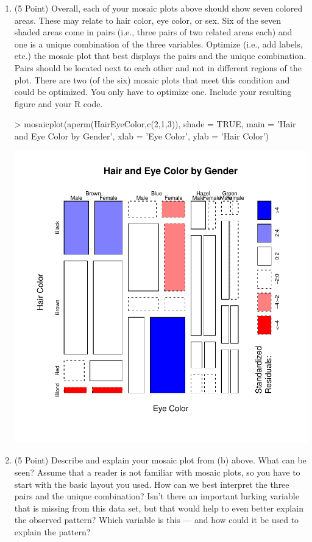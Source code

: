 \documentclass[12pt,letterpaper,final]{article}
\begin{document}
\begin{enumerate}
\begin{enumerate}
\item (5 Point) Overall, each of your mosaic plots above should show seven colored areas.
These may relate to hair color, eye color, or sex. Six of the seven shaded areas 
come in pairs (i.e., three pairs of two related areas each) 
and one is a unique combination of the three variables.
Optimize (i.e., add labels, etc.) the mosaic plot that best displays the pairs and 
the unique combination. 
Pairs should be located next to each other and not in different regions of the plot.
There are two (of the six) mosaic plots that meet this condition and could be optimized.
You only have to optimize one.
Include your resulting figure and your R code. \\

\begin{Schunk}
\begin{Sinput}
> mosaicplot(aperm(HairEyeColor,c(2,1,3)), shade = TRUE, main = 'Hair and Eye Color by Gender', xlab = 'Eye Color', ylab = 'Hair Color')
\end{Sinput}
\end{Schunk}
\includegraphics{hw02_bartschi-016}


\item (5 Point) Describe and explain your mosaic plot from (b) above. 
What can be seen? Assume that a reader is not familiar with mosaic plots,
so you have to start with the basic layout you used. How can we best interpret
the three pairs and the unique combination? Isn't there an important lurking variable that
is missing from this data set, but that would help to even better explain the
observed pattern? Which variable is this --- and how could it be used to explain
the pattern?


\end{enumerate}
\end{enumerate}
\end{document}
